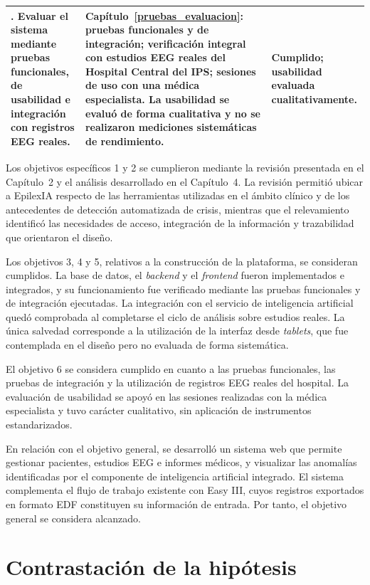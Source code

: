 \begin{longtable}{|
>{\raggedright\arraybackslash}p{}|
>{\raggedright\arraybackslash}p{}|
>{\raggedright\arraybackslash}p{}|}
6. Evaluar el sistema mediante pruebas funcionales, de usabilidad e integración con registros EEG reales. &
Capítulo~\ref{pruebas_evaluacion}: pruebas funcionales y de integración; verificación integral con estudios EEG reales del Hospital Central del IPS; sesiones de uso con una médica especialista.
La usabilidad se evaluó de forma cualitativa y no se realizaron mediciones sistemáticas de rendimiento. &
Cumplido; usabilidad evaluada cualitativamente. \\
\hline

\end{longtable}
\endgroup

Los objetivos específicos 1 y 2 se cumplieron mediante la revisión presentada en el Capítulo~2 y el análisis desarrollado en el Capítulo~4.
La revisión permitió ubicar a EpilexIA respecto de las herramientas utilizadas en el ámbito clínico y de los antecedentes de detección automatizada de crisis, mientras que el relevamiento identificó las necesidades de acceso, integración de la información y trazabilidad que orientaron el diseño.

Los objetivos 3, 4 y 5, relativos a la construcción de la plataforma, se consideran cumplidos.
La base de datos, el \textit{backend} y el \textit{frontend} fueron implementados e integrados, y su funcionamiento fue verificado mediante las pruebas funcionales y de integración ejecutadas.
La integración con el servicio de inteligencia artificial quedó comprobada al completarse el ciclo de análisis sobre estudios reales.
La única salvedad corresponde a la utilización de la interfaz desde \textit{tablets}, que fue contemplada en el diseño pero no evaluada de forma sistemática.

El objetivo 6 se considera cumplido en cuanto a las pruebas funcionales, las pruebas de integración y la utilización de registros EEG reales del hospital.
La evaluación de usabilidad se apoyó en las sesiones realizadas con la médica especialista y tuvo carácter cualitativo, sin aplicación de instrumentos estandarizados.

En relación con el objetivo general, se desarrolló un sistema web que permite gestionar pacientes, estudios EEG e informes médicos, y visualizar las anomalías identificadas por el componente de inteligencia artificial integrado.
El sistema complementa el flujo de trabajo existente con Easy III, cuyos registros exportados en formato EDF constituyen su información de entrada.
Por tanto, el objetivo general se considera alcanzado.


\section{Contrastación de la hipótesis}
\label{sec:contrastacion-hipotesis}

